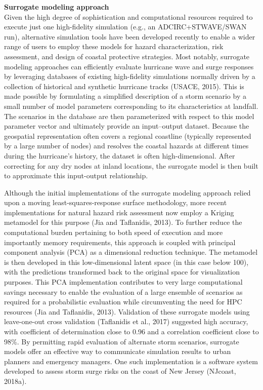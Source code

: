\noindent\textbf{Surrogate modeling approach} \\Given the high degree of sophistication and computational resources required to execute just one high-fidelity simulation (e.g., an ADCIRC+STWAVE/SWAN run), alternative simulation tools have been developed recently to enable a wider range of users to employ these models for hazard characterization, risk assessment, and design of coastal protective strategies. Most notably, surrogate modeling approaches can efficiently evaluate hurricane wave and surge responses by leveraging databases of existing high-fidelity simulations normally driven by a collection of historical and synthetic hurricane tracks (USACE, 2015). This is made possible by formulating a simplified description of a storm scenario by a small number of model parameters corresponding to its characteristics at landfall. The scenarios in the database are then parameterized with respect to this model parameter vector and ultimately provide an input–output dataset. Because the geospatial representation often covers a regional coastline (typically represented by a large number of nodes) and resolves the coastal hazards at different times during the hurricane’s history, the dataset is often high-dimensional. After correcting for any dry nodes at inland locations, the surrogate model is then built to approximate this input-output relationship.

Although the initial implementations of the surrogate modeling approach relied upon a moving least-squares-response surface methodology, more recent implementations for natural hazard risk assessment now employ a Kriging metamodel for this purpose (Jia and Taflanidis, 2013). To further reduce the computational burden pertaining to both speed of execution and more importantly memory requirements, this approach is coupled with principal component analysis (PCA) as a dimensional reduction technique. The metamodel is then developed in this low-dimensional latent space (in this case below 100), with the predictions transformed back to the original space for visualization purposes. This PCA implementation contributes to very large computational savings necessary to enable the evaluation of a large ensemble of scenarios as required for a probabilistic evaluation while circumventing the need for HPC resources (Jia and Taflanidis, 2013). Validation of these surrogate models using leave-one-out cross validation (Taflanidis et al., 2017) suggested high accuracy, with coefficient of determination close to 0.96 and a correlation coefficient close to 98\%. By permitting rapid evaluation of alternate storm scenarios, surrogate models offer an effective way to communicate simulation results to urban planners and emergency managers. One such implementation is a software system developed to assess storm surge risks on the coast of New Jersey (NJcoast, 2018a).

